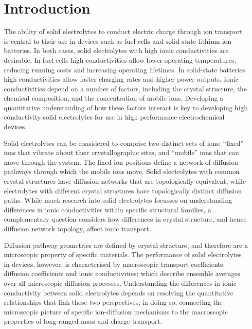 \documentclass[aps,prb,twocolumn,superscriptaddress,reprint]{revtex4-1}
\begin{document}
\section{Introduction}

The ability of solid electrolytes to conduct electric charge through ion transport is central to their use in devices such as fuel cells and solid-state lithium-ion batteries.\cite{BachmanEtAl_ChemRev2016, ManthiramEtAl_NatRevMater2017,GoodenoughAndSingh_JElectrochemSoc2015, MalavasiEtAl_ChemSocRev2010} In both cases, solid electrolytes with high ionic conductivities are desirable. In fuel cells high conductivities allow lower operating temperatures, reducing running costs and increasing operating lifetimes. In solid-state batteries high conductivities allow faster charging rates and higher power outputs. Ionic conductivities depend on a number of factors, including the crystal structure, the chemical composition, and the concentration of mobile ions.\cite{VanDerVenEtAl_AccChemRes2013} Developing a quantitative understanding of how these factors interact is key to developing high conductivity solid electrolytes for use in high performance electrochemical devices.

Solid electrolytes can be considered to comprise two distinct sets of ions: ``fixed'' ions that vibrate about their crystallographic sites, and ``mobile'' ions that can move through the system. The fixed ion positions define a network of diffusion pathways through which the mobile ions move. Solid electrolytes with common crystal structures have diffusion networks that are topologically equivalent, while electrolytes with different crystal structures have topologically distinct diffusion paths. While much research into solid electrolytes focusses on understanding differences in ionic conductivities within specific structural families, a complementary question considers how differences in crystal structure, and hence diffusion network topology, affect ionic transport.

Diffusion pathway geometries are defined by crystal structure, and therefore are  a microscopic property of specific materials. The performance of solid electrolytes in devices, however, is characterised by macroscopic transport coefficients: diffusion coefficients and ionic conductivities; which describe ensemble averages over all microscopic diffusion processes. Understanding the differences in ionic conductivity between solid electrolytes depends on resolving the quantitative relationships that link these two perspectives; in doing so, connecting the microscopic picture of specific ion-diffusion mechanisms to the macroscopic properties of long-ranged mass and charge transport.
\end{document}

